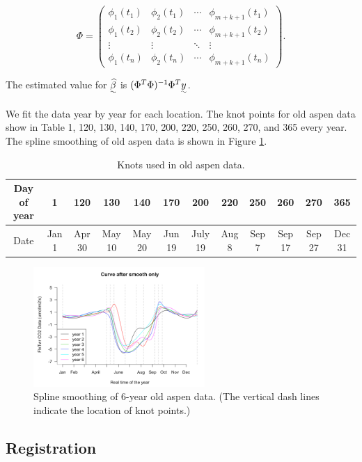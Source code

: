 \documentclass{article}\usepackage[]{graphicx}\usepackage[]{color}
\begin{document}
\begin{equation}
\Phi=
  \begin{pmatrix}
  \phi_1(t_1) & \phi_2(t_1) & \cdots & \phi_{m+k+1}(t_1) \\
  \phi_1(t_2) & \phi_2(t_2) & \cdots & \phi_{m+k+1}(t_2) \\
  \vdots & \vdots & \ddots & \vdots \\
  \phi_1(t_n) & \phi_2(t_n) & \cdots & \phi_{m+k+1}(t_n)
  \end{pmatrix}.
\end{equation}

The estimated value for $\uwave{\widehat{\beta}}$  is $(\Phi^T\Phi)^{-1}\Phi^T\uwave{y}$.

We fit the data year by year for each location.
The knot points for old aspen data show in Table  1, 120, 130, 140, 170, 200, 220, 250, 260, 270, and 365 every year. 
The spline smoothing of old aspen data is shown in Figure \ref{Fig:smoothOA}. 


\begin{table}[!ht]
\caption{Knots used in old aspen data.}\label{Tab:knots}
\centering
\def\arraystretch{1.5}
\begin{tabular}{|c|ccccccccccc|}
\hline
Day of year & 1 & 120 & 130 & 140 & 170 & 200 & 220 & 250 & 260 & 270 & 365\\ \hline
Date & Jan 1 & Apr 30 & May 10 & May 20 & Jun 19 & July 19 & Aug 8 & Sep 7  & Sep 17 & Sep 27 & Dec 31\\ \hline
\end{tabular}
\end{table}


\begin{figure}[!ht]
\centering
\includegraphics[width=0.58\textwidth]{Original2.png}
\caption{Spline smoothing of 6-year old aspen data. (The vertical dash lines indicate the location of knot points.)}\label{Fig:smoothOA}
\end{figure}


\subsection{Registration}\label{Sec:Regi}
\end{document}
